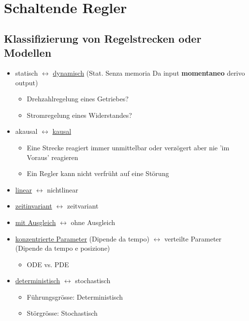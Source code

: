 \section{Schaltende Regler}

\subsection{Klassifizierung von Regelstrecken oder Modellen}

\begin{itemize}
    \item statisch $\leftrightarrow$ \underline{dynamisch} \quad 
    {\small(Stat. \textrightarrow Senza memoria \textrightarrow Da input \textbf{momentaneo} derivo output)}
    \begin{itemize}
        \item Drehzahlregelung eines Getriebes?
        \item Stromregelung eines Widerstandes?
    \end{itemize}
    \item akausal $\leftrightarrow$ \underline{kausal}
    \begin{itemize}
        \item Eine Strecke reagiert immer unmittelbar oder verzögert aber nie 'im Voraus' reagieren
        \item Ein Regler kann nicht verfrüht auf eine Störung
    \end{itemize}
    \item \underline{linear} $\leftrightarrow$ nichtlinear
    \item \underline{zeitinvariant} $\leftrightarrow$ zeitvariant
    \item \underline{mit Ausgleich} $\leftrightarrow$ ohne Ausgleich
    \item \underline{konzentrierte Parameter} (Dipende da tempo) $\leftrightarrow$ verteilte Parameter (Dipende da tempo e posizione)
    \begin{itemize}
        \item ODE vs. PDE
    \end{itemize}
    \item \underline{deterministisch} $\leftrightarrow$ stochastisch
    \begin{itemize}
        \item Führungsgrösse: Deterministisch
        \item Störgrösse: Stochastisch
    \end{itemize}
\end{itemize}


